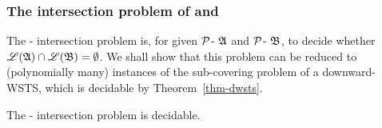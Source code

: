 

\subsubsection{The intersection problem of {\WOTrNFA} and {\NFA}} \label{sec:fatrnfa}
The {\WOTrNFA}-{\NFA} intersection problem is, for given ${\mathcal{P} }$-{\WOTrNFA} ${\mathfrak{A} }$ and ${\mathcal{P} }$-{\NFA} ${\mathfrak{B} }$, to decide  whether ${\mathscr{L} }({\mathfrak{A} }) \cap {\mathscr{L} }({\mathfrak{B} }) = \emptyset$. We shall show that this problem %
can be reduced to (polynomially many) instances of the sub-covering problem of a downward-WSTS, which is decidable by Theorem~\ref{thm-dwsts}.

\begin{proposition}\label{prop-wstrnfa-nfa-intersect}
	The {\WOTrNFA}-{\NFA} intersection problem is decidable.
\end{proposition}







